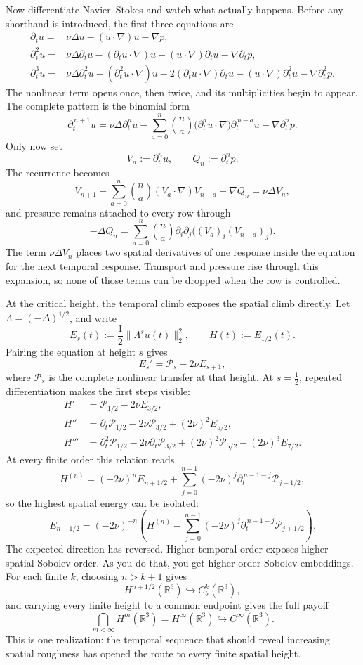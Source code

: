 Now differentiate Navier--Stokes and watch what actually happens. Before any
shorthand is introduced, the first three equations are
\[
\begin{aligned}
\partial_tu
={}&\nu\Delta u
 -(u\!\cdot\nabla)u
 -\nabla p,\\[3pt]
\partial_t^2u
={}&\nu\Delta\partial_tu
 -(\partial_tu\!\cdot\nabla)u
 -(u\!\cdot\nabla)\partial_tu
 -\nabla\partial_tp,\\[3pt]
\partial_t^3u
={}&\nu\Delta\partial_t^2u
 -(\partial_t^2u\!\cdot\nabla)u
 -2(\partial_tu\!\cdot\nabla)\partial_tu
 -(u\!\cdot\nabla)\partial_t^2u
 -\nabla\partial_t^2p.
\end{aligned}
\]
The nonlinear term opens once, then twice, and its multiplicities begin to
appear. The complete pattern is the binomial form
\[
\partial_t^{\,n+1}u
=\nu\Delta\partial_t^nu
-\sum_{a=0}^{n}\binom na
  \bigl(\partial_t^au\!\cdot\nabla\bigr)
  \partial_t^{\,n-a}u
-\nabla\partial_t^np.
\]
Only now set
\[
V_n:=\partial_t^nu,
\qquad
Q_n:=\partial_t^np.
\]
The recurrence becomes
\[
V_{n+1}
+\sum_{a=0}^{n}\binom na
  (V_a\!\cdot\nabla)V_{n-a}
+\nabla Q_n
=\nu\Delta V_n,
\]
and pressure remains attached to every row through
\[
-\Delta Q_n
=\sum_{a=0}^{n}\binom na
  \partial_i\partial_j
  \bigl((V_a)_i(V_{n-a})_j\bigr).
\]
The term \(\nu\Delta V_n\) places two spatial derivatives of one response
inside the equation for the next temporal response. Transport and pressure
rise through this expansion, so none of those terms can be dropped when
the row is controlled.

At the critical height, the temporal climb exposes the spatial climb directly.
Let \(\Lambda=(-\Delta)^{1/2}\), and write
\[
E_s(t):=\frac12\|\Lambda^su(t)\|_2^2,
\qquad
H(t):=E_{1/2}(t).
\]
Pairing the equation at height \(s\) gives
\[
E_s'=\mathcal P_s-2\nu E_{s+1},
\]
where \(\mathcal P_s\) is the complete nonlinear transfer at that height. At
\(s=\tfrac12\), repeated differentiation makes the first steps visible:
\[
\begin{aligned}
H'
&=\mathcal P_{1/2}-2\nu E_{3/2},\\
H''
&=\partial_t\mathcal P_{1/2}
  -2\nu\mathcal P_{3/2}
  +(2\nu)^2E_{5/2},\\
H'''
&=\partial_t^2\mathcal P_{1/2}
  -2\nu\partial_t\mathcal P_{3/2}
  +(2\nu)^2\mathcal P_{5/2}
  -(2\nu)^3E_{7/2}.
\end{aligned}
\]
At every finite order this relation reads
\[
H^{(n)}
=(-2\nu)^nE_{n+1/2}
+\sum_{j=0}^{n-1}(-2\nu)^j
  \partial_t^{\,n-1-j}\mathcal P_{j+1/2},
\]
so the highest spatial energy can be isolated:
\[
E_{n+1/2}
=(-2\nu)^{-n}
\left(
H^{(n)}
-\sum_{j=0}^{n-1}(-2\nu)^j
 \partial_t^{\,n-1-j}\mathcal P_{j+1/2}
\right).
\]
The expected direction has reversed. Higher temporal order exposes higher
spatial Sobolev order. As you do that, you get higher order Sobolev embeddings.
For each finite \(k\), choosing \(n>k+1\) gives
\[
H^{n+1/2}(\mathbb R^3)\hookrightarrow C_b^k(\mathbb R^3),
\]
and carrying every finite height to a common endpoint gives the full payoff
\[
\bigcap_{m<\infty}H^m(\mathbb R^3)
=H^\infty(\mathbb R^3)
\hookrightarrow C^\infty(\mathbb R^3).
\]
This is one realization: the temporal sequence that should reveal increasing
spatial roughness has opened the route to every finite spatial height.

